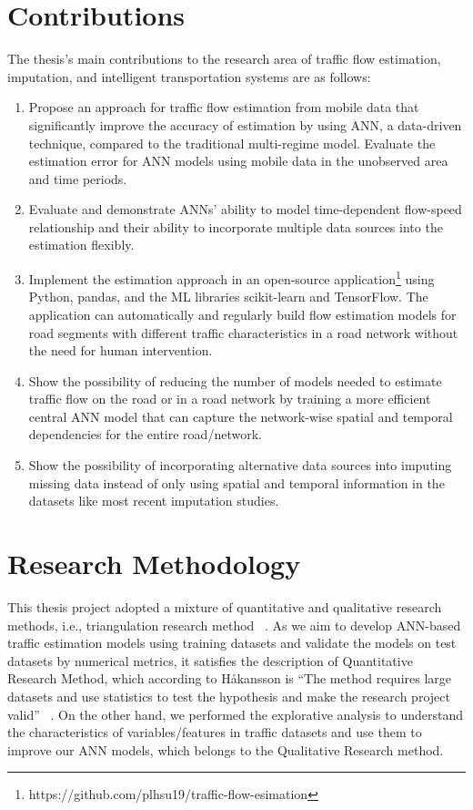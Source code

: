\documentclass[english]{kththesis}
\begin{document}
\section{Contributions}
\label{sec:contributions}
The thesis's main contributions to the research area of traffic flow estimation, imputation, and intelligent transportation systems are as follows:
\begin{enumerate}
    \item Propose an approach for traffic flow estimation from mobile data that significantly improve the accuracy of estimation by using ANN, a data-driven technique, compared to the traditional multi-regime model. Evaluate the estimation error for ANN models using mobile data in the unobserved area and time periods.
    \item Evaluate and demonstrate ANNs' ability to model time-dependent flow-speed relationship and their ability to incorporate multiple data sources into the estimation flexibly.
    \item Implement the estimation approach in an open-source application\footnote{https://github.com/plhsu19/traffic-flow-esimation}  using Python, pandas, and the ML libraries scikit-learn and TensorFlow.  The application can automatically and regularly build flow estimation models for road segments with different traffic characteristics in a road network without the need for human intervention.
    \item Show the possibility of reducing the number of models needed to estimate traffic flow on the road or in a road network by training a more efficient central ANN model that can capture the network-wise spatial and temporal dependencies for the entire road/network.
    \item Show the possibility of incorporating alternative data sources into imputing missing data instead of only using spatial and temporal information in the datasets like most recent imputation studies.
\end{enumerate}


\section{Research Methodology}

This thesis project adopted a mixture of quantitative and qualitative research methods, i.e., triangulation research method ~\cite{hakansson_research_method}. As we aim to develop ANN-based traffic estimation models using training datasets and validate the models on test datasets by numerical metrics, it satisfies the description of Quantitative Research Method, which according to Håkansson is “The method requires large datasets and use statistics to test the hypothesis and make the research project valid” ~\cite{hakansson_research_method}. On the other hand, we performed the explorative analysis to understand the characteristics of variables/features in traffic datasets and use them to improve our ANN models, which belongs to the Qualitative Research method.
\end{document}
